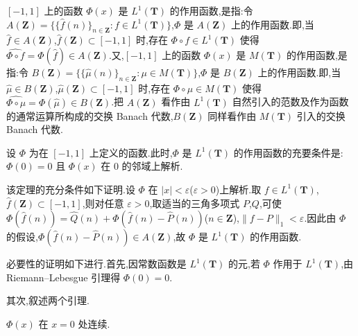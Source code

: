 \begin{definition}\label{def:3.5.8}
$[-1, 1]$ 上的函数 $\Phi(x)$ 是 $L^{1}(\mathbf{T})$ 的作用函数,是指:令 $A(\mathbf{Z}) = \{\{\widehat{f}(n)\}_{n \in \mathbf{Z}}: f \in L^{1}(\mathbf{T})\}$,$\Phi$ 是 $A(\mathbf{Z})$ 上的作用函数.即,当 $\widehat{f} \in A(\mathbf{Z})$,$\widehat{f}(\mathbf{Z}) \subset [-1, 1]$ 时,存在 $\Phi \circ f \in L^{1}(\mathbf{T})$ 使得 $\widehat{\Phi \circ f} = \Phi(\widehat{f}) \in A(\mathbf{Z})$.又,$[-1, 1]$ 上的函数 $\Phi(x)$ 是 $M(\mathbf{T})$ 的作用函数,是指:令 $B(\mathbf{Z}) = \{\{\widehat{\mu}(n)\}_{n \in \mathbf{Z}}: \mu \in M(\mathbf{T})\}$,$\Phi$ 是 $B(\mathbf{Z})$ 上的作用函数.即,当 $\widehat{\mu} \in B(\mathbf{Z})$,$\widehat{\mu}(\mathbf{Z}) \subset [-1, 1]$ 时,存在 $\Phi \circ \mu \in M(\mathbf{T})$ 使得 $\widehat{\Phi \circ \mu} = \Phi(\widehat{\mu}) \in B(\mathbf{Z})$.把 $A(\mathbf{Z})$ 看作由 $L^{1}(\mathbf{T})$ 自然引入的范数及作为函数的通常运算所构成的交换 Banach 代数,$B(\mathbf{Z})$ 同样看作由 $M(\mathbf{T})$ 引入的交换 Banach 代数.
\end{definition}

\begin{theorem}\label{thm:3.5.9}
设 $\Phi$ 为在 $[-1, 1]$ 上定义的函数.此时,$\Phi$ 是 $L^{1}(\mathbf{T})$ 的作用函数的充要条件是:$\Phi(0) = 0$ 且 $\Phi(x)$ 在 0 的邻域上解析.
\end{theorem}

该定理的充分条件如下证明.设 $\Phi$ 在 $|x| < \varepsilon$($\varepsilon > 0$)上解析.取 $f \in L^{1}(\mathbf{T})$,$\hat{f}(\mathbf{Z}) \subset [-1, 1]$,则对任意 $\varepsilon > 0$,取适当的三角多项式 $P$,$Q$,可使 $\Phi(\widehat{f}(n)) = \widehat{Q}(n) + \Phi(\widehat{f}(n) - \widehat{P}(n))$($n \in \mathbf{Z}$),$\|f - P\|_{1} < \varepsilon$.因此由 $\Phi$ 的假设,$\Phi(\widehat{f}(n) - \widehat{P}(n)) \in A(\mathbf{Z})$,故 $\Phi$ 是 $L^{1}(\mathbf{T})$ 的作用函数.

必要性的证明如下进行.首先,因常数函数是 $L^{1}(\mathbf{T})$ 的元,若 $\Phi$ 作用于 $L^{1}(\mathbf{T})$,由 Riemann--Lebesgue 引理得 $\Phi(0) = 0$.

其次,叙述两个引理.

\begin{lemma}\label{lem:3.5.10}
$\Phi(x)$ 在 $x = 0$ 处连续.
\end{lemma}


